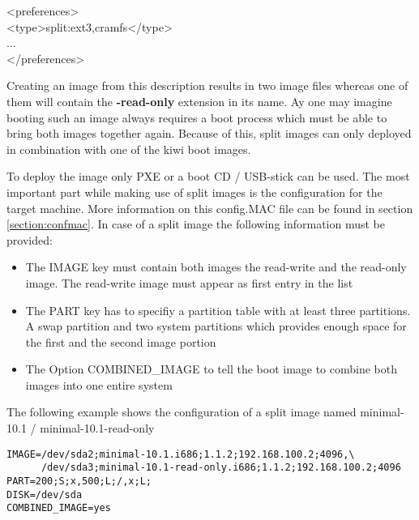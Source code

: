 \begin{Command}{9cm}
<preferences>\\
\hspace*{1cm}<type>split:ext3,cramfs</type>\\
\hspace*{1cm}...\\
</preferences>
\end{Command}

Creating an image from this description results in two image files
whereas one of them will contain the \textbf{-read-only} extension
in its name. Ay one may imagine booting such an image always requires
a boot process which must be able to bring both images together again.
Because of this, split images can only deployed in combination with
one of the kiwi boot images.

To deploy the image only PXE or a boot CD / USB-stick can be used.
The most important part while making use of split images is the
configuration for the target machine. More information on this config.MAC
file can be found in section \ref{section:confmac}. In case of a split
image the following information must be provided:

\begin{itemize}
\item The IMAGE key must contain both images the read-write and the read-only
      image. The read-write image must appear as first entry in the list
\item The PART key has to specifiy a partition table with at least three
      partitions. A swap partition and two system partitions which provides
      enough space for the first and the second image portion
\item The Option COMBINED\_IMAGE to tell the boot image to combine both
      images into one entire system
\end{itemize}

The following example shows the configuration of a split image named
minimal-10.1 / minimal-10.1-read-only

\begin{verbatim}
IMAGE=/dev/sda2;minimal-10.1.i686;1.1.2;192.168.100.2;4096,\
      /dev/sda3;minimal-10.1-read-only.i686;1.1.2;192.168.100.2;4096
PART=200;S;x,500;L;/,x;L;
DISK=/dev/sda
COMBINED_IMAGE=yes
\end{verbatim}

